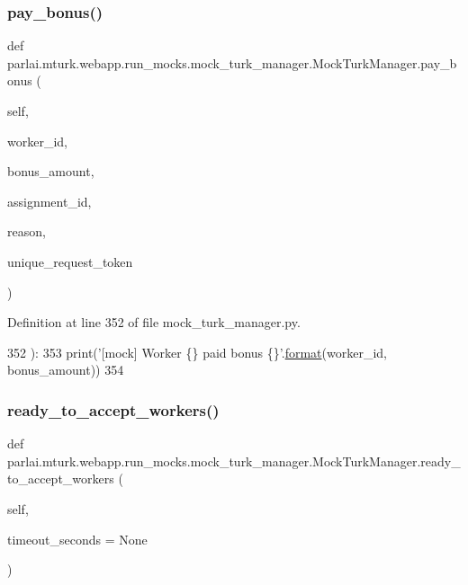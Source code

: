 \subsubsection{\texorpdfstring{pay\+\_\+bonus()}{pay\_bonus()}}
{\footnotesize\ttfamily def parlai.\+mturk.\+webapp.\+run\+\_\+mocks.\+mock\+\_\+turk\+\_\+manager.\+Mock\+Turk\+Manager.\+pay\+\_\+bonus (\begin{DoxyParamCaption}\item[{}]{self,  }\item[{}]{worker\+\_\+id,  }\item[{}]{bonus\+\_\+amount,  }\item[{}]{assignment\+\_\+id,  }\item[{}]{reason,  }\item[{}]{unique\+\_\+request\+\_\+token }\end{DoxyParamCaption})}



Definition at line 352 of file mock\+\_\+turk\+\_\+manager.\+py.


\begin{DoxyCode}
352     ):
353         print(\textcolor{stringliteral}{'[mock] Worker \{\} paid bonus \{\}'}.\hyperlink{namespaceparlai_1_1chat__service_1_1services_1_1messenger_1_1shared__utils_a32e2e2022b824fbaf80c747160b52a76}{format}(worker\_id, bonus\_amount))
354 
\end{DoxyCode}
\mbox{\label{classparlai_1_1mturk_1_1webapp_1_1run__mocks_1_1mock__turk__manager_1_1MockTurkManager_aaa9ce23bc143b033706d145e16078119}} 
\subsubsection{\texorpdfstring{ready\+\_\+to\+\_\+accept\+\_\+workers()}{ready\_to\_accept\_workers()}}
{\footnotesize\ttfamily def parlai.\+mturk.\+webapp.\+run\+\_\+mocks.\+mock\+\_\+turk\+\_\+manager.\+Mock\+Turk\+Manager.\+ready\+\_\+to\+\_\+accept\+\_\+workers (\begin{DoxyParamCaption}\item[{}]{self,  }\item[{}]{timeout\+\_\+seconds = {\ttfamily None} }\end{DoxyParamCaption})}

